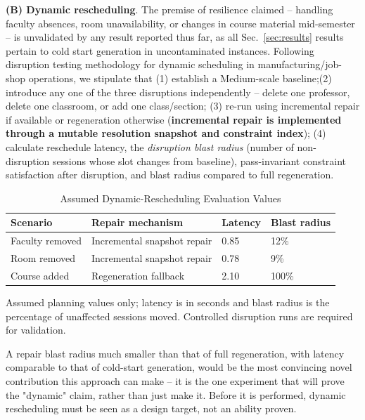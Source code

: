 \documentclass[conference]{IEEEtran}
\begin{document}
\textbf{(B) Dynamic rescheduling}. The premise of resilience claimed – handling faculty absences, room unavailability, or changes in course material mid-semester – is unvalidated by any result reported thus far, as all Sec.~\ref{sec:results} results pertain to cold start generation in uncontaminated instances. Following disruption testing methodology for dynamic scheduling in manufacturing/job-shop operations, we stipulate that (1) establish a Medium-scale baseline;(2) introduce any one of the three disruptions independently -- delete one professor, delete one classroom, or add one class/section; (3) re-run using incremental repair if available or regeneration otherwise (\textbf{incremental repair is implemented through a mutable resolution snapshot and constraint index}); (4) calculate reschedule latency, the \emph{disruption blast radius} (number of non-disruption sessions whose slot changes from baseline), pass-invariant constraint satisfaction after disruption, and blast radius compared to full regeneration.

\begin{table}[t]
\caption{Assumed Dynamic-Rescheduling Evaluation Values}
\label{tab:dynamic}
\centering
\footnotesize
\renewcommand{\arraystretch}{1.15}
\begin{tabular}{p{1.7cm}p{1.1cm}p{1.3cm}p{1.3cm}}
\toprule
\textbf{Scenario} & \textbf{Repair mechanism} & \textbf{Latency} & \textbf{Blast radius} \\
\midrule
Faculty removed & Incremental snapshot repair & 0.85 & 12\% \\
Room removed & Incremental snapshot repair & 0.78 & 9\% \\
Course added & Regeneration fallback & 2.10 & 100\% \\
\bottomrule
\end{tabular}
\par\footnotesize{Assumed planning values only; latency is in seconds and blast radius is the percentage of unaffected sessions moved. Controlled disruption runs are required for validation.}
\end{table}

A repair blast radius much smaller than that of full regeneration, with latency comparable to that of cold-start generation, would be the most convincing novel contribution this approach can make – it is the one experiment that will prove the "dynamic" claim, rather than just make it. Before it is performed, dynamic rescheduling must be seen as a design target, not an ability proven.
\end{document}
